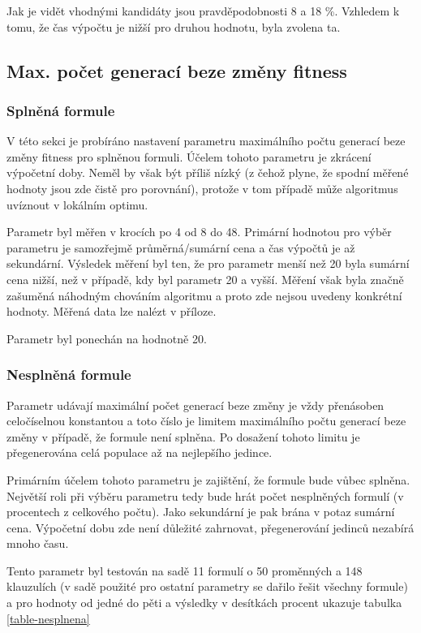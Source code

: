 \documentclass[a4paper]{article}
\begin{document}
		Jak je vidět vhodnými kandidáty jsou pravděpodobnosti 8 a 18 \%. Vzhledem k tomu, že čas výpočtu je nižší pro druhou hodnotu, byla zvolena ta.
	
	\subsection{Max. počet generací beze změny fitness}
		\subsubsection{Splněná formule}
			V této sekci je probíráno nastavení parametru maximálního počtu generací beze změny fitness pro splněnou formuli. Účelem tohoto parametru je zkrácení výpočetní doby. Neměl by však být příliš nízký (z čehož plyne, že spodní měřené hodnoty jsou zde čistě pro porovnání), protože v tom případě může algoritmus uvíznout v lokálním optimu.
			
			Parametr byl měřen v krocích po 4 od 8 do 48. Primární hodnotou pro výběr parametru je samozřejmě průměrná/sumární cena a čas výpočtů je až sekundární. Výsledek měření byl ten, že  pro parametr menší než 20 byla sumární cena nižší, než v případě, kdy byl parametr 20 a vyšší. Měření však byla značně zašuměná náhodným chováním algoritmu a proto zde nejsou uvedeny konkrétní hodnoty. Měřená data lze nalézt v příloze.
			
			Parametr byl ponechán na hodnotně 20.

		\subsubsection{Nesplněná formule}
			Parametr udávají maximální počet generací beze změny je vždy přenásoben celočíselnou konstantou a toto číslo je limitem maximálního počtu generací beze změny v případě, že formule není splněna. Po dosažení tohoto limitu je přegenerována celá populace až na nejlepšího jedince.
			
			Primárním účelem tohoto parametru je zajištění, že formule bude vůbec splněna. Největší roli při výběru parametru tedy bude hrát počet nesplněných formulí (v procentech z celkového počtu). Jako sekundární je pak brána v potaz sumární cena. Výpočetní dobu zde není důležité zahrnovat, přegenerování jedinců nezabírá mnoho času.
			
			Tento parametr byl testován na sadě 11 formulí o 50 proměnných a 148 klauzulích (v sadě použité pro ostatní parametry se dařilo řešit všechny formule) a pro hodnoty od jedné do pěti a výsledky v desítkách procent ukazuje tabulka \ref{table-nesplnena}
			
\end{document}
